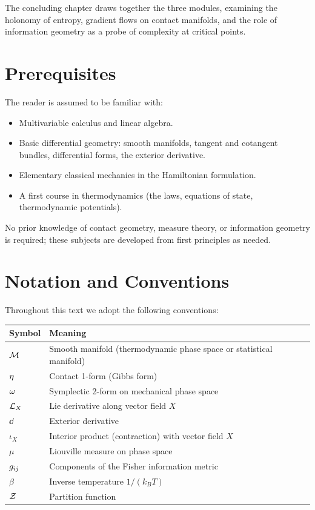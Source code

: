 The concluding chapter draws together the three modules, examining the holonomy of entropy, gradient flows on contact manifolds, and the role of information geometry as a probe of complexity at critical points.

\section{Prerequisites}

The reader is assumed to be familiar with:
\begin{itemize}
\item Multivariable calculus and linear algebra.
\item Basic differential geometry: smooth manifolds, tangent and cotangent bundles, differential forms, the exterior derivative.
\item Elementary classical mechanics in the Hamiltonian formulation.
\item A first course in thermodynamics (the laws, equations of state, thermodynamic potentials).
\end{itemize}

No prior knowledge of contact geometry, measure theory, or information geometry is required; these subjects are developed from first principles as needed.

\section{Notation and Conventions}

Throughout this text we adopt the following conventions:

\begin{table}[H]
\centering
\renewcommand{\arraystretch}{1.5}
\begin{tabular}{ll}
\toprule
\textbf{Symbol} & \textbf{Meaning} \\
\midrule
$\mathcal{M}$ & Smooth manifold (thermodynamic phase space or statistical manifold) \\
$\eta$ & Contact 1-form (Gibbs form) \\
$\omega$ & Symplectic 2-form on mechanical phase space \\
$\mathcal{L}_X$ & Lie derivative along vector field $X$ \\
$\dd$ & Exterior derivative \\
$\iota_X$ & Interior product (contraction) with vector field $X$ \\
$\mu$ & Liouville measure on phase space \\
$g_{ij}$ & Components of the Fisher information metric \\
$\beta$ & Inverse temperature $1/(k_B T)$ \\
$\mathcal{Z}$ & Partition function \\
\bottomrule
\end{tabular}
\end{table}
